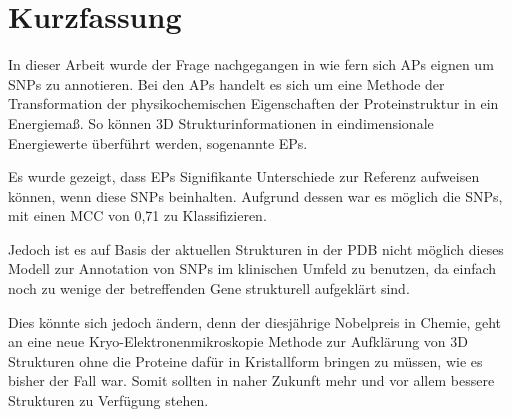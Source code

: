 
\chapter{Kurzfassung}

In dieser Arbeit wurde der Frage nachgegangen in wie fern sich \acf{APs} eignen um \acf{SNPs} zu annotieren. Bei den \ac{APs} handelt es sich um eine Methode der Transformation der physikochemischen Eigenschaften der Proteinstruktur in ein Energiemaß. So können 3D Strukturinformationen in eindimensionale Energiewerte überführt werden, sogenannte \acf{EPs}.

Es wurde gezeigt, dass \ac{EPs} Signifikante Unterschiede zur Referenz aufweisen können, wenn diese SNPs beinhalten. Aufgrund dessen war es möglich die \ac{SNPs}, mit einen \ac{MCC} von 0,71 zu Klassifizieren.

Jedoch ist es auf Basis der aktuellen Strukturen in der \ac{PDB} nicht möglich dieses Modell zur Annotation von \ac{SNPs} im klinischen Umfeld zu benutzen, da einfach noch zu wenige der betreffenden Gene strukturell aufgeklärt sind.

Dies könnte sich jedoch ändern, denn der diesjährige Nobelpreis in Chemie, geht an eine neue Kryo-Elektronenmikroskopie Methode zur Aufklärung von 3D Strukturen ohne die Proteine dafür in Kristallform bringen zu müssen, wie es bisher der Fall war. Somit sollten in naher Zukunft mehr und vor allem bessere Strukturen zu Verfügung stehen.

